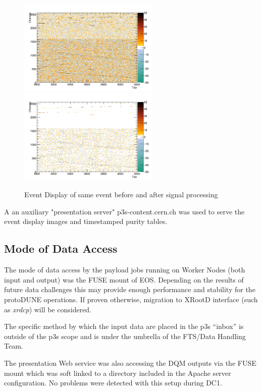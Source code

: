 \documentclass[pdftex,12pt,letter]{article}
\newcommand{\pd}{protoDUNE\xspace}
\begin{document}
\begin{figure}[tbh]
  \centering
  \includegraphics[width=0.6\textwidth]{./ReportImages/adcraw_evt33_ch0-2559.png}
  \includegraphics[width=0.6\textwidth]{./ReportImages/adcprep_evt33_ch0-2559.png}

  \caption{Event Display of same event before and after signal processing}
  \label{fig:evdisp}
\end{figure}

\noindent  A an auxiliary "presentation server" p3s-content.cern.ch
was used to serve the event display images and timestamped purity tables.

\subsection{Mode of Data Access}
The mode of data access by the payload jobs running on Worker Nodes (both input and output) was the FUSE mount of EOS.
Depending on the results of future data challenges this may provide enough performance and
stability for the \pd operations. If proven otherwise, migration to XRootD interface (such as \textit{xrdcp})
will be considered.

The specific method by which the input data are placed in the p3s ``inbox'' is outside of the p3s scope and is
under the umbrella of the FTS/Data Handling Team.

The presentation Web service was also accessing the DQM outputs via the FUSE mount which was 
soft linked to a directory included in the Apache server configuration. No problems were detected
with this setup during DC1.
\end{document}
